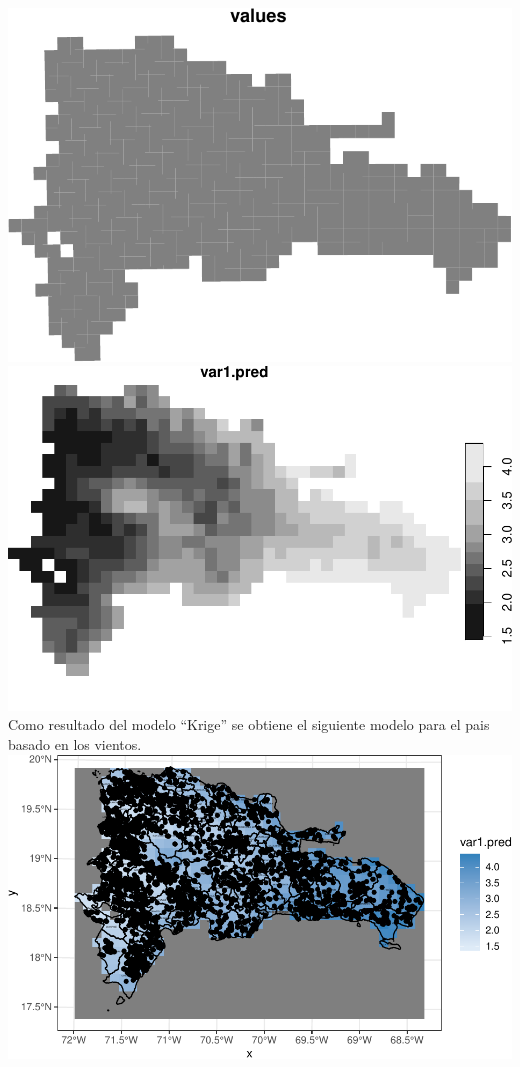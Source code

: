 \documentclass[11pt,]{article}
\begin{document}
\includegraphics{proyecto_files/figure-latex/unnamed-chunk-45-1.pdf}
\includegraphics{proyecto_files/figure-latex/unnamed-chunk-46-1.pdf}
Como resultado del modelo ``Krige'' se obtiene el siguiente modelo para
el pais basado en los vientos.
\includegraphics{proyecto_files/figure-latex/unnamed-chunk-47-1.pdf}
\end{document}
